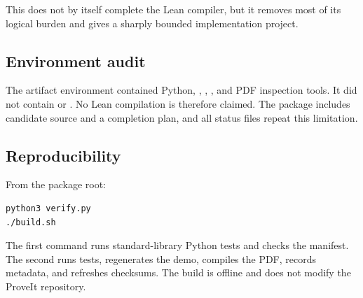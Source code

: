 This does not by itself complete the Lean compiler, but it removes most of its
logical burden and gives a sharply bounded implementation project.

\subsection{Environment audit}

The artifact environment contained Python, , ,
, and PDF inspection tools.  It did not contain  or
.  No Lean compilation is therefore claimed.  The package includes
candidate source and a completion plan, and all status files repeat this
limitation.

\subsection{Reproducibility}

From the package root:

\begin{lstlisting}[language={}]
python3 verify.py
./build.sh
\end{lstlisting}

The first command runs standard-library Python tests and checks the manifest.
The second runs tests, regenerates the demo, compiles the PDF, records metadata,
and refreshes checksums.  The build is offline and does not modify the ProveIt
repository.
